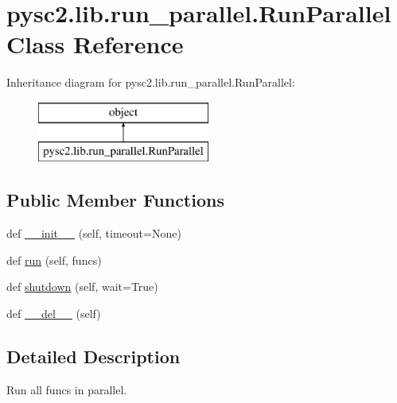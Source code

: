 \hypertarget{classpysc2_1_1lib_1_1run__parallel_1_1_run_parallel}{}\section{pysc2.\+lib.\+run\+\_\+parallel.\+Run\+Parallel Class Reference}
\label{classpysc2_1_1lib_1_1run__parallel_1_1_run_parallel}
Inheritance diagram for pysc2.\+lib.\+run\+\_\+parallel.\+Run\+Parallel\+:\begin{figure}[H]
\begin{center}
\leavevmode
\includegraphics[height=2.000000cm]{classpysc2_1_1lib_1_1run__parallel_1_1_run_parallel}
\end{center}
\end{figure}
\subsection*{Public Member Functions}
\begin{DoxyCompactItemize}
\item 
def \mbox{\hyperlink{classpysc2_1_1lib_1_1run__parallel_1_1_run_parallel_aa887a194de13532b110dfe92f0789b82}{\+\_\+\+\_\+init\+\_\+\+\_\+}} (self, timeout=None)
\item 
def \mbox{\hyperlink{classpysc2_1_1lib_1_1run__parallel_1_1_run_parallel_a2f255ba938812c81a7ef748dc358d10e}{run}} (self, funcs)
\item 
def \mbox{\hyperlink{classpysc2_1_1lib_1_1run__parallel_1_1_run_parallel_a3a4d5322d86770d3b32f58b76b544723}{shutdown}} (self, wait=True)
\item 
def \mbox{\hyperlink{classpysc2_1_1lib_1_1run__parallel_1_1_run_parallel_ac948b68a569a8c31a3a0099513c187dc}{\+\_\+\+\_\+del\+\_\+\+\_\+}} (self)
\end{DoxyCompactItemize}


\subsection{Detailed Description}
\begin{DoxyVerb}Run all funcs in parallel.\end{DoxyVerb}
 

